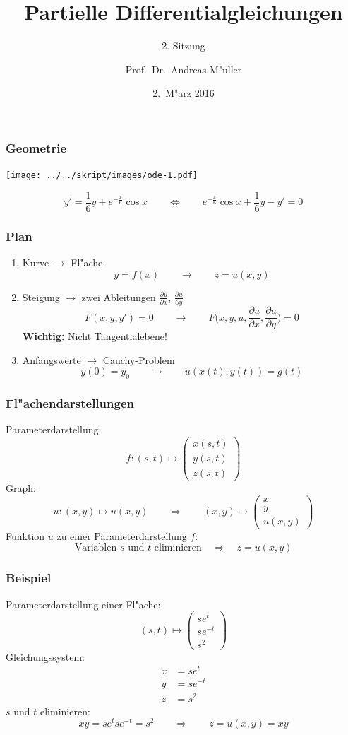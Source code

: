 \documentclass[handout]{beamer}
\title[]{Partielle Differentialgleichungen}
\subtitle{2. Sitzung}
\date[2.~M"arz 2016]{2.~M"arz 2016}
\author{Prof.~Dr.~Andreas M"uller}
\begin{document}
\begin{frame}
\titlepage

\end{frame}

\begin{frame}
\frametitle{Geometrie}
\begin{center}
\texttt{[image: ../../skript/images/ode-1.pdf]}
\end{center}
\[
y'=\frac16y+e^{-\frac{x}6}\cos x
\qquad\Leftrightarrow\qquad
e^{-\frac{x}6}\cos x
+
\frac16y
-
y'
=0
\]
\end{frame}

\begin{frame}
\frametitle{Plan}
\begin{enumerate}
\item Kurve
\pause
$\to$ Fl"ache
\[
y = f(x)
\qquad\to \qquad
z = u(x,y)
\]
\pause
\item Steigung
\pause
$\to$ zwei Ableitungen
$\displaystyle\frac{\partial u}{\partial x}$,
$\displaystyle\frac{\partial u}{\partial y}$
\[
F(x,y,y')=0
\qquad\to \qquad
F\biggl(x,y,u,\frac{\partial u}{\partial x},\frac{\partial u}{\partial y}
\biggr)=0
\]
\pause
{\bf Wichtig:} Nicht Tangentialebene!
\pause
\item Anfangswerte
\pause
$\to$ Cauchy-Problem
\[
y(0)=y_0
\qquad\to \qquad
u(x(t),y(t)) = g(t)
\]
\end{enumerate}
\end{frame}

\begin{frame}
\frametitle{Fl"achendarstellungen}
Parameterdarstellung:
\pause
\[
f\colon (s,t)\mapsto\begin{pmatrix}
x(s,t)\\y(s,t)\\z(s,t)
\end{pmatrix}
\]
\pause
Graph:
\pause
\[
u\colon (x,y)\mapsto u(x,y)
\qquad\Rightarrow\qquad
(x,y)\mapsto\begin{pmatrix}
x\\y\\u(x,y)
\end{pmatrix}
\]
\pause
Funktion $u$ zu einer Parameterdarstellung $f$:
\pause
\[
\text{Variablen $s$ und $t$ eliminieren}\quad\Rightarrow\quad
z=u(x,y)
\]
\end{frame}

\begin{frame}
\frametitle{Beispiel}
Parameterdarstellung einer Fl"ache:
\[
(s,t)\mapsto\begin{pmatrix}
se^t\\se^{-t}\\s^2
\end{pmatrix}
\]
Gleichungssystem:
\begin{align*}
x&=se^t\\
y&=se^{-t}\\
z&=s^2
\end{align*}
$s$ und $t$ eliminieren:
\[
xy=se^tse^{-t}=s^2
\qquad\Rightarrow\qquad
z=u(x,y)=xy
\]
\end{frame}
\end{document}

